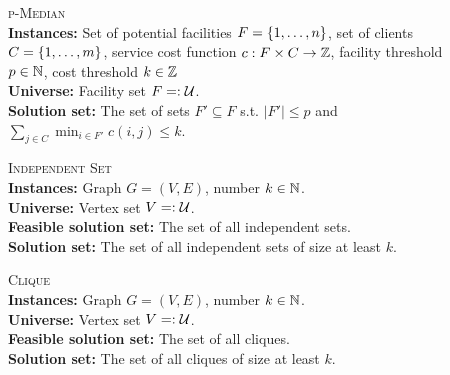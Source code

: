 \begin{samepage}
    \begin{mdframed}
    	\begin{description} 
        \item[]\textsc{p-Median}\hfill\\
        \textbf{Instances:} Set of potential facilities $F = \{ 1, \ldots, n \}$, set of clients $C = \{ 1, \ldots, m \}$, service cost function $c: F \times C \rightarrow \mathbb{Z}$, facility threshold $p \in \mathbb{N}$, cost threshold $k \in \mathbb{Z}$\\
        \textbf{Universe:} Facility set $F =: \mathcal{U}$.\\
        \textbf{Solution set:} The set of sets $F' \subseteq F$ s.t. $|F'| \leq p$ and $\sum_{j \in C} \min_{i \in F'} c(i, j) \leq k$.
    	\end{description}
    \end{mdframed}
\end{samepage}

\begin{samepage}
    \begin{mdframed}
    	\begin{description} 
        \item[]\textsc{Independent Set}\hfill\\
        \textbf{Instances:} Graph $G = (V,E)$, number $k \in \mathbb{N}$.\\
        \textbf{Universe:} Vertex set $V =: \mathcal{U}$.\\
        \textbf{Feasible solution set:} The set of all independent sets.\\
        \textbf{Solution set:} The set of all independent sets of size at least $k$.
    	\end{description}
    \end{mdframed}
\end{samepage}

\begin{samepage}
    \begin{mdframed}
    	\begin{description}   
        \item[]\textsc{Clique}\hfill\\
        \textbf{Instances:} Graph $G = (V, E)$, number $k \in \mathbb{N}$.\\
        \textbf{Universe:} Vertex set $V =: \mathcal{U}$.\\
        \textbf{Feasible solution set:} The set of all cliques.\\
        \textbf{Solution set:} The set of all cliques of size at least $k$.
    	\end{description}
    \end{mdframed}
\end{samepage}


